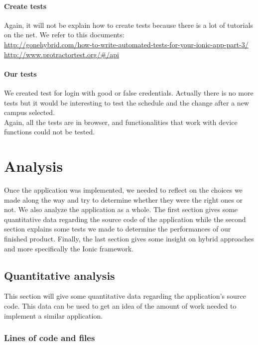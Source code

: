 \documentclass{eplmastersthesis}
\begin{document}
\subsubsection{Create tests}

Again, it will not be explain how to create tests because there is a lot of tutorials on the net. We refer to this documents:\\
\url{http://gonehybrid.com/how-to-write-automated-tests-for-your-ionic-app-part-3/}\\
\url{http://www.protractortest.org/#/api}

\subsubsection{Our tests}
We created test for login with good or false credentials.
Actually there is no more tests but it would be interesting to test the schedule and the change after a new campus selected.\\
Again, all the tests are in browser, and functionalities that work with device functions could not be tested.

\chapter{Analysis}

Once the application was implemented, we needed to reflect on the choices we made along the way and try to determine whether they were the right ones or not. We also analyze the application as a whole. The first section gives some quantitative data regarding the source code of the application while the second section explains some tests we made to determine the performances of our finished product. Finally, the last section gives some insight on hybrid approaches and more specifically the Ionic framework.

\section{Quantitative analysis}

This section will give some quantitative data regarding the application's source code. This data can be used to get an idea of the amount of work needed to implement a similar application.

\subsection{Lines of code and files}
\end{document}

